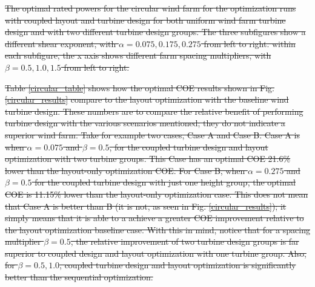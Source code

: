 \documentclass[wes, manuscript]{copernicus}
\providecommand{\DIFdel}[1]{{\protect\color{red}\sout{#1}}}                      %
\providecommand{\DIFdelbegin}{} %
\providecommand{\DIFdelFL}[1]{\DIFdel{#1}} %
\begin{document}
\DIFdelbegin %
{%
\DIFdelFL{The optimal rated powers for the circular wind farm for the optimization runs with coupled layout and turbine design for both uniform wind farm turbine design and with two different turbine design groups. The three subfigures show a different shear exponent, with $\alpha=0.075,0.175,0.275$ from left to right. within each subfigure, the x axis shows different farm spacing multipliers, with $\beta=0.5,1.0,1.5$ from left to right.}}

\DIFdel{Table \ref{circular_table} shows how the optimal COE results shown in Fig. \ref{circular_results} compare to the layout optimization with the baseline wind turbine design. These numbers are to compare the relative benefit of performing turbine design with the various scenarios mentioned; they do not indicate a superior wind farm. Take for example two cases, Case A and Case B. Case A is when $\alpha=0.075$ and $\beta=0.5$, for the coupled turbine design and layout optimization with two turbine groups. This Case has an optimal COE 21.6\% lower than the layout-only optimization COE. For Case B, when $\alpha=0.275$ and $\beta=0.5$ for the coupled turbine design with just one height group, the optimal COE is 11.15\% lower than the layout-only optimization case. This does not mean that Case A is better than B (it is not, as seen in Fig. \ref{circular_results}); it simply means that it is able to a achieve a greater COE improvement relative to the layout optimization baseline case. With this in mind, notice that for a spacing multiplier $\beta=0.5$, the relative improvement of two turbine design groups is far superior to coupled design and layout optimization with one turbine group. Also, for $\beta=0.5,1.0$, coupled turbine design and layout optimization is significantly better than the sequential optimization.
}%
\end{document}
